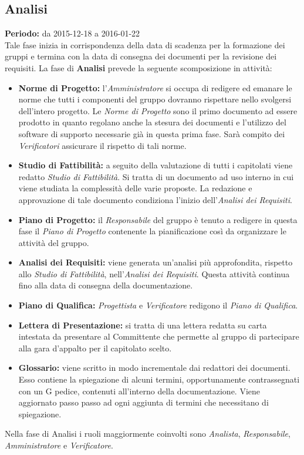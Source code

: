 \subsection{Analisi}
\textbf{Periodo:} da 2015-12-18 a 2016-01-22 \\
Tale fase inizia in corrispondenza della data di scadenza per la formazione dei gruppi e termina con la data di consegna dei documenti per la revisione dei requisiti. La fase di \textbf{Analisi} prevede la seguente scomposizione in attività:
\begin{itemize}
\item \textbf{Norme di Progetto:} l'\textit{Amministratore} si occupa di redigere ed emanare le norme che tutti i componenti del gruppo dovranno rispettare nello svolgersi dell'intero progetto. Le \textit{Norme di Progetto} sono il primo documento ad essere prodotto in quanto regolano anche la stesura dei documenti e l'utilizzo del software di supporto necessarie già in questa prima fase. Sarà compito dei \textit{Verificatori} assicurare il rispetto di tali norme.
\item \textbf{Studio di Fattibilità:} a seguito della valutazione di tutti i capitolati viene redatto \textit{Studio di Fattibilità}. Si tratta di un documento ad uso interno in cui viene studiata la complessità delle varie proposte. La redazione e approvazione di tale documento condiziona l'inizio dell'\textit{Analisi dei Requisiti}.
\item \textbf{Piano di Progetto:} il \textit{Responsabile} del gruppo è tenuto a redigere in questa fase il \textit{Piano di Progetto} contenente la pianificazione così da organizzare le attività del gruppo.
\item \textbf{Analisi dei Requisiti:} viene generata un'analisi più approfondita, rispetto allo \textit{Studio di Fattibilità}, nell'\textit{Analisi dei Requisiti}. Questa attività continua fino alla data di consegna della documentazione.
\item \textbf{Piano di Qualifica:} \textit{Progettista} e \textit{Verificatore} redigono il \textit{Piano di Qualifica}.
\item \textbf{Lettera di Presentazione:} si tratta di una lettera redatta su carta intestata da presentare al Committente che permette al gruppo di partecipare alla gara d'appalto per il capitolato scelto.
\item \textbf{Glossario:} viene scritto in modo incrementale dai redattori dei documenti. Esso contiene la spiegazione di alcuni termini, opportunamente contrassegnati con un G pedice, contenuti all'interno della documentazione. Viene aggiornato passo passo ad ogni aggiunta di termini che necessitano di spiegazione.
\end{itemize}
Nella fase di Analisi i ruoli maggiormente coinvolti sono \textit{Analista}, \textit{Responsabile}, \textit{Amministratore} e \textit{Verificatore}.

